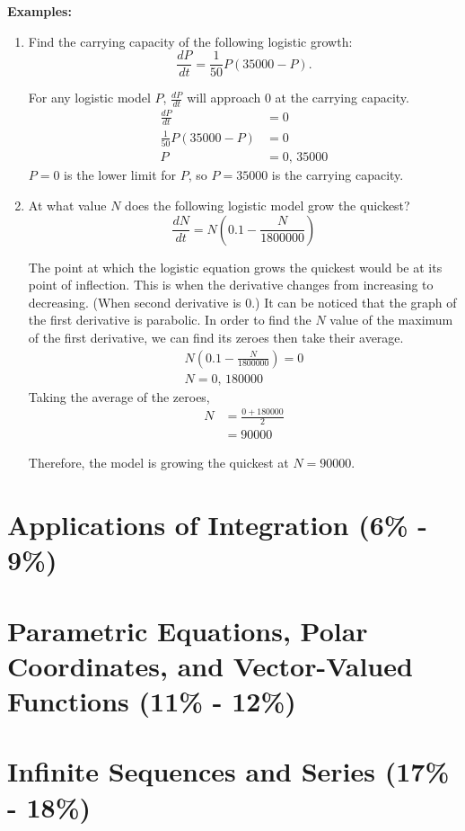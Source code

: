 \documentclass[12pt]{article}
\begin{document}
            \noindent \textbf{Examples:}
            \begin{enumerate}
                \item Find the carrying capacity of the following logistic growth:
                \[ \frac{dP}{dt} = \frac{1}{50} P (35000 - P). \]

                For any logistic model $P$, $\frac{dP}{dt}$ will approach $0$ at the carrying capacity.
                \begin{align*}
                    \frac{dP}{dt} &= 0 \\[6pt]
                    \frac{1}{50} P (35000 - P) &= 0 \\[6pt]
                    P &= 0, \, 35000
                \end{align*}
                $P=0$ is the lower limit for $P$, so $P=35000$ is the carrying capacity.
                \bigskip

                \item At what value $N$ does the following logistic model grow the quickest?
                \[ \frac{dN}{dt} = N \left( 0.1 - \frac{N}{1800000} \right) \]

                The point at which the logistic equation grows the quickest would be at its point of inflection. This is when the derivative changes from increasing to decreasing. (When second derivative is $0$.) It can be noticed that the graph of the first derivative is parabolic. In order to find the $N$ value of the maximum of the first derivative, we can find its zeroes then take their average.
                \begin{gather*}
                    N \left( 0.1 - \frac{N}{1800000} \right) = 0 \\[6pt]
                    N = 0, \, 180000
                \end{gather*}
                Taking the average of the zeroes,
                \begin{align*}
                    N &= \frac{0 + 180000}{2} \\[6pt]
                    &= 90000
                \end{align*}

                Therefore, the model is growing the quickest at $N=90000$.
            \end{enumerate}

    \section{Applications of Integration (6\% - 9\%)}

    \section{Parametric Equations, Polar Coordinates, and Vector-Valued Functions (11\% - 12\%)}

    \section{Infinite Sequences and Series (17\% - 18\%)}
\end{document}
